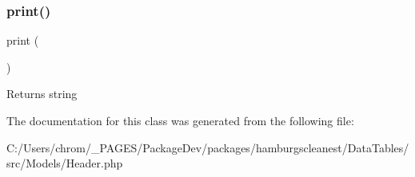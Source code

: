 \subsubsection{\texorpdfstring{print()}{print()}}
{\footnotesize\ttfamily print (\begin{DoxyParamCaption}{ }\end{DoxyParamCaption})}

\begin{DoxyReturn}{Returns}
string 
\end{DoxyReturn}


The documentation for this class was generated from the following file\+:\begin{DoxyCompactItemize}
\item 
C\+:/\+Users/chrom/\+\_\+\+P\+A\+G\+E\+S/\+Package\+Dev/packages/hamburgscleanest/\+Data\+Tables/src/\+Models/Header.\+php\end{DoxyCompactItemize}
